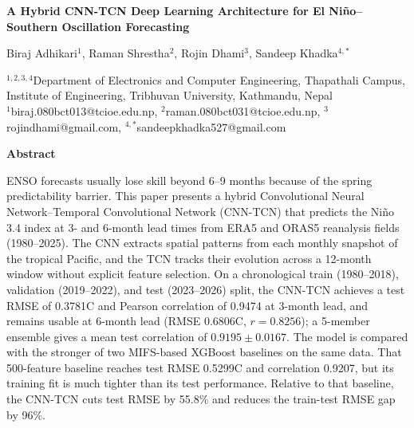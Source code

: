 \documentclass[10pt,a4paper]{article}
\begin{document}
\pagestyle{plain}

\begin{center}
{\fontsize{17}{20}\selectfont\bfseries A Hybrid CNN-TCN Deep Learning Architecture for El Ni\~no--Southern Oscillation Forecasting}

\vspace{0.5em}
{\fontsize{13}{16}\selectfont Biraj Adhikari$^{1}$, Raman Shrestha$^{2}$, Rojin Dhami$^{3}$, Sandeep Khadka$^{4,\ast}$}

\vspace{0.25em}
{\fontsize{8}{10}\selectfont
$^{1,2,3,4}$Department of Electronics and Computer Engineering, Thapathali Campus, Institute of Engineering, Tribhuvan University, Kathmandu, Nepal\\



$^{1}$biraj.080bct013@tcioe.edu.np,
$^{2}$raman.080bct031@tcioe.edu.np,
$^{3}$rojindhami@gmail.com,
$^{4,\ast}$sandeepkhadka527@gmail.com
}
\end{center}

\vspace{0.3em}
\textbf{Abstract}

{\fontsize{9}{11}\selectfont ENSO forecasts usually lose skill beyond 6--9 months because of the spring predictability barrier. This paper presents a hybrid Convolutional Neural Network--Temporal Convolutional Network (CNN-TCN) that predicts the Ni\~no 3.4 index at 3- and 6-month lead times from ERA5 and ORAS5 reanalysis fields (1980--2025). The CNN extracts spatial patterns from each monthly snapshot of the tropical Pacific, and the TCN tracks their evolution across a 12-month window without explicit feature selection. On a chronological train (1980--2018), validation (2019--2022), and test (2023--2026) split, the CNN-TCN achieves a test RMSE of 0.3781\textdegree C and Pearson correlation of 0.9474 at 3-month lead, and remains usable at 6-month lead (RMSE 0.6806\textdegree C, $r=0.8256$); a 5-member ensemble gives a mean test correlation of $0.9195\pm0.0167$. The model is compared with the stronger of two MIFS-based XGBoost baselines on the same data. That 500-feature baseline reaches test RMSE 0.5299\textdegree C and correlation 0.9207, but its training fit is much tighter than its test performance. Relative to that baseline, the CNN-TCN cuts test RMSE by 55.8\% and reduces the train-test RMSE gap by 96\%.\par}
\end{document}
